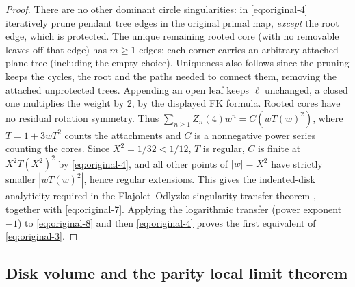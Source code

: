 \begin{proof}
There are no other dominant circle singularities: in \eqref{eq:original-4} iteratively prune pendant tree edges in the original primal map, \emph{except} the root edge, which is protected.
The unique remaining rooted core (with no removable leaves off that edge) has \(m\ge1\) edges; each corner carries an arbitrary attached plane tree (including the empty choice).
Uniqueness also follows since the pruning keeps the cycles, the root and the paths needed to connect them, removing the attached unprotected trees.
Appending an open leaf keeps \(\ell\) unchanged, a closed one multiplies the weight by 2, by the displayed FK formula.
Rooted cores have no residual rotation symmetry.
Thus \(\sum_{n\ge1} Z_n(4)w^n=C(wT(w)^2)\), where \(T=1+3wT^2\) counts the attachments and \(C\) is a nonnegative power series counting the cores.
Since \(X^2=1/32<1/12\), \(T\) is regular, \(C\) is finite at \(X^2T(X^2)^2\) by \eqref{eq:original-4}, and all other points of \(|w|=X^2\) have strictly smaller \(|w T(w)^2|\), hence regular extensions.
This gives the indented-disk analyticity required in the Flajolet--Odlyzko singularity transfer theorem \citep{FlajoletOdlyzko}, together with \eqref{eq:original-7}.
Applying the logarithmic transfer (power exponent \(-1\)) to \eqref{eq:original-8} and then \eqref{eq:original-4} proves the first equivalent of \eqref{eq:original-3}.

\end{proof}

\subsection{Disk volume and the parity local limit theorem}\label{disk:volume}

